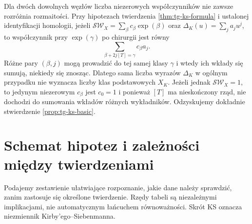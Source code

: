 \begin{uwaga}
Dla dwóch dowolnych węzłów liczba niezerowych współczynników
nie zawsze rozróżnia rozmaitości. Przy hipotezach twierdzenia \ref{thm:tg-ks-formula}
i ustalonej identyfikacji homologii, jeżeli
$\mathcal{SW}_X=\sum_\beta c_\beta\exp(\beta)$ oraz
$\Delta_K(u)=\sum_j a_ju^j$, to współczynnik przy
$\exp(\gamma)$ po chirurgii jest równy
\[
 \sum_{\beta+2j[T]=\gamma}c_\beta a_j.
\]
Różne pary $(\beta,j)$ mogą prowadzić do tej samej klasy
$\gamma$ i wtedy ich wkłady się sumują, niekiedy się znosząc.
Dlatego sama liczba wyrazów $\Delta_K$ w ogólnym przypadku
nie wyznacza liczby klas podstawowych $X_K$.
Jeżeli jednak $\mathcal{SW}_X=1$, to jedynym
niezerowym $c_\beta$ jest $c_0=1$ i ponieważ
$[T]$ ma nieskończony rząd, nie dochodzi do
sumowania wkładów różnych wykładników.
Odzyskujemy dokładnie stwierdzenie
\ref{prop:tg-ks-basic}.
\end{uwaga}

\section{Schemat hipotez i zależności między twierdzeniami}
\label{sec:tg-syn-assumptions}

Podajemy zestawienie ułatwiające rozpoznanie, jakie dane
należy sprawdzić, zanim zastosuje się określone twierdzenie.
Rzędy tabeli są niezależnymi implikacjami, nie automatycznym
łańcuchem równoważności. Skrót KS oznacza niezmiennik
Kirby'ego--Siebenmanna.

